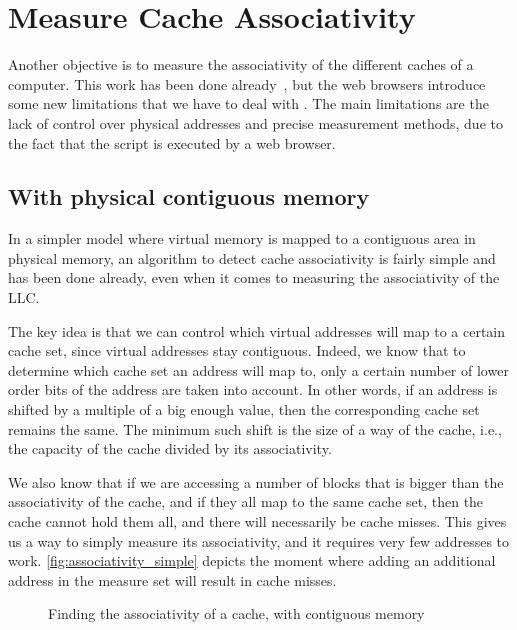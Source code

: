 \documentclass[a4paper,11pt,oneside]{report}
\begin{document}
\section{Measure Cache Associativity}
\label{sec:measure_associativity}

Another objective is to measure the associativity of the different caches of a computer. This work has been done already~\cite{tlb_characteristics}, but the web browsers introduce some new limitations that we have to deal with .
The main limitations are the lack of control over physical addresses and precise measurement methods, due to the fact that the script is executed by a web browser.

\subsection{With physical contiguous memory}
\label{sec:llc_eviction_simple}
In a simpler model where virtual memory is mapped to a contiguous area in physical memory, an algorithm to detect cache associativity is fairly simple and has been done already, even when it comes to measuring the associativity of the LLC.

The key idea is that we can control which virtual addresses will map to a certain cache set, since virtual addresses stay contiguous. Indeed, we know that to determine which cache set an address will map to, only a certain number of lower order bits of the address are taken into account. In other words, if an address is shifted by a multiple of a big enough value, then the corresponding cache set remains the same. The minimum such shift is the size of a way of the cache, i.e., the capacity of the cache divided by its associativity.

We also know that if we are accessing a number of blocks that is bigger than the associativity of the cache, and if they all map to the same cache set, then the cache cannot hold them all, and there will necessarily be cache misses. This gives us a way to simply measure its associativity, and it requires very few addresses to work. \autoref{fig:associativity_simple} depicts the moment where adding an additional address in the measure set will result in cache misses.

\begin{figure}
    \centering
    \caption{Finding the associativity of a cache, with contiguous memory}
    \label{fig:associativity_simple}
\end{figure}
\end{document}
